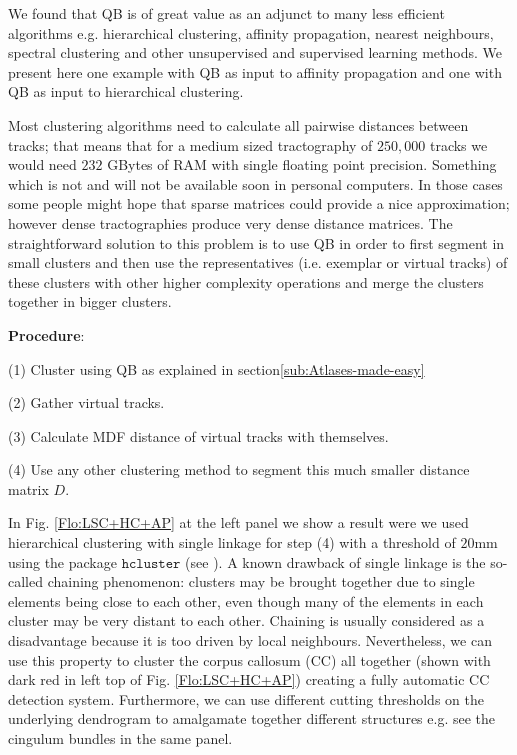 \documentclass[preprint,authoryear,a4paper,10pt,onecolumn]{elsarticle}
\begin{document}
We found that QB is of great value as an adjunct to many less efficient
algorithms e.g. hierarchical clustering, affinity propagation, nearest
neighbours, spectral clustering and other unsupervised and supervised
learning methods. We present here one example with QB as input to
affinity propagation and one with QB as input to hierarchical
clustering.

Most clustering algorithms need to calculate all pairwise distances
between tracks; that means that for a medium sized tractography of
$250,000$ tracks we would need $232$ GBytes of RAM with single floating
point precision. Something which is not and will not be available soon
in personal computers. In those cases some people might hope that sparse
matrices could provide a nice approximation; however dense
tractographies produce very dense distance matrices. The straightforward
solution to this problem is to use QB in order to first segment in small
clusters and then use the representatives (i.e. exemplar or virtual
tracks) of these clusters with other higher complexity operations and
merge the clusters together in bigger clusters.

\textbf{Procedure}:

(1) Cluster using QB as explained in section\ref{sub:Atlases-made-easy}

(2) Gather virtual tracks.

(3) Calculate MDF distance of virtual tracks with themselves.

(4) Use any other clustering method to segment this much smaller distance
matrix $D$.

In Fig. \ref{Flo:LSC+HC+AP} at the left panel we show a result were
we used hierarchical clustering with single linkage for step (4) with
a threshold of $20$mm using the package $\texttt{hcluster}$ (see
\cite{eads-hcluster-software}). A known drawback of single linkage
is the so-called chaining phenomenon: clusters may be brought together
due to single elements being close to each other, even though many
of the elements in each cluster may be very distant to each other.
Chaining is usually considered as a disadvantage because it is too
driven by local neighbours. Nevertheless, we can use this property
to cluster the corpus callosum (CC) all together (shown with dark
red in left top of Fig. \ref{Flo:LSC+HC+AP}) creating a fully automatic
CC detection system.  Furthermore, we can use different cutting thresholds
on the underlying dendrogram to amalgamate together different structures
e.g. see the cingulum bundles in the same panel.
\end{document}
